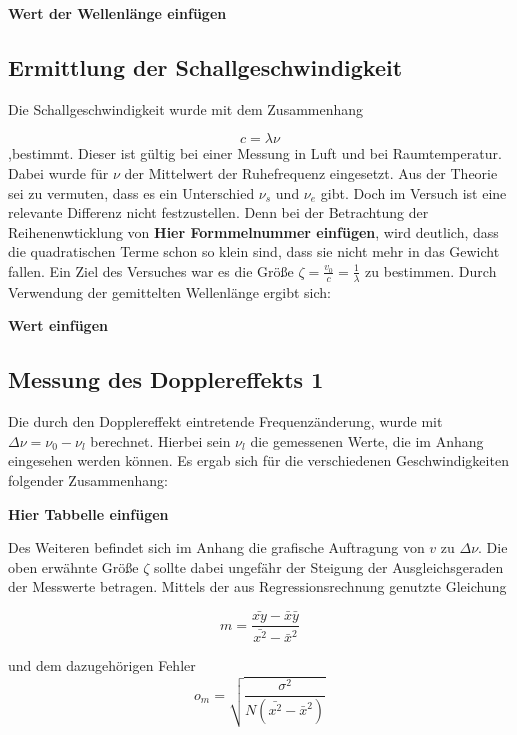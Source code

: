 \textbf{Wert der Wellenlänge einfügen}

\subsection{Ermittlung der Schallgeschwindigkeit}
Die Schallgeschwindigkeit wurde mit dem Zusammenhang

\begin{equation}
c=\lambda \nu
\end{equation}
,bestimmt. Dieser ist gültig bei einer Messung in Luft und bei Raumtemperatur.
Dabei wurde für $\nu$ der Mittelwert der Ruhefrequenz eingesetzt.
Aus der Theorie sei zu vermuten, dass es ein Unterschied $\nu_s$ und $\nu_e$ gibt.
Doch im Versuch ist eine relevante Differenz nicht festzustellen. 
Denn bei der Betrachtung der Reihenenwticklung von \textbf{Hier Formmelnummer einfügen},
wird deutlich, dass die quadratischen Terme schon so klein sind, dass sie nicht mehr in
das Gewicht fallen. Ein Ziel des Versuches war es die Größe $\zeta=\frac{v_0}{c}=\frac{1}{\lambda}$
zu bestimmen.
Durch Verwendung der gemittelten Wellenlänge ergibt sich:

\textbf{Wert einfügen}

\subsection{Messung des Dopplereffekts 1}
Die durch den Dopplereffekt eintretende Frequenzänderung, wurde 
mit $\Delta \nu=\nu_0-\nu_l$ berechnet. Hierbei sein $\nu_l$ die 
gemessenen Werte, die im Anhang eingesehen werden können.
Es ergab sich für die verschiedenen Geschwindigkeiten folgender Zusammenhang:

\textbf{Hier Tabbelle einfügen}

Des Weiteren befindet sich im Anhang die grafische Auftragung 
von $v$ zu $\Delta \nu$. 
Die oben erwähnte Größe $\zeta$ sollte dabei ungefähr der 
Steigung der Ausgleichsgeraden der Messwerte betragen.
Mittels der aus Regressionsrechnung genutzte Gleichung

\begin{equation*}
m=\frac{\bar{xy}-\bar{x}\bar{y}}{\bar{x^2}-\bar{x}^2}
\end{equation*}

und dem dazugehörigen Fehler
\begin{equation*}
o_m=\sqrt{\frac{\sigma^2}{N(\bar{x^2}-\bar{x}^2)}}
\end{equation*}

